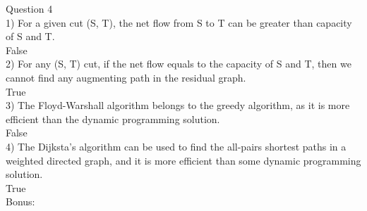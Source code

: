 \documentclass{article}
\begin{document}
Question 4\\
1) For a given cut (S, T), the net flow from S to T can be greater than capacity of S and T.\\
False\\
2) For any (S, T) cut, if the net flow equals to the capacity of S and T, then we cannot find any augmenting path in the residual graph.\\
True\\
3) The Floyd-Warshall algorithm belongs to the greedy algorithm, as it is more efficient than the dynamic programming solution.\\
False\\
4) The Dijksta's algorithm can be used to find the all-pairs shortest paths in a weighted directed graph, and it is more efficient than some dynamic programming solution.\\
True\\

Bonus:
\end{document}
